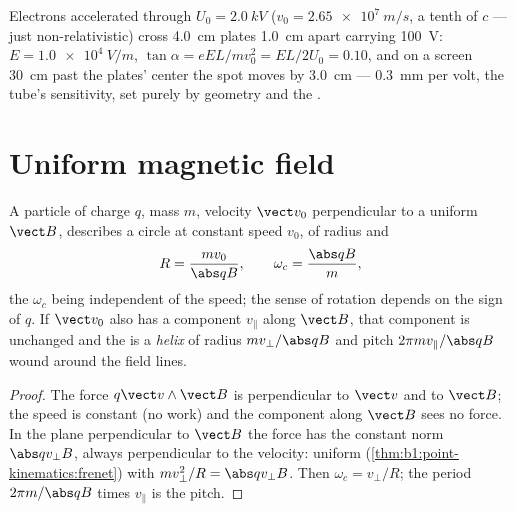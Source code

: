 \begin{example}\label{ex:b1:charged-particles:crt}
Electrons accelerated through $U_0 = \qty{2.0}{kV}$ ($v_0 = \qty{2.65e7}{m/s}$,
a tenth of $c$ --- just non-relativistic) cross \qty{4.0}{cm} plates
\qty{1.0}{cm} apart carrying \qty{100}{V}: $E = \qty{1.0e4}{V/m}$,
$\tan\alpha = eEL/mv_0^2 = EL/2U_0 = 0.10$, and on a screen \qty{30}{cm}
past the plates' center the spot moves by \qty{3.0}{cm} --- \qty{0.3}{mm}
per volt, the tube's sensitivity, set purely by geometry and the
.
\end{example}

\section{Uniform magnetic field}

\begin{theorem}\label{thm:b1:charged-particles:bfield}
A particle of charge $q$, mass $m$, velocity $\vect v_0$ perpendicular to
a uniform $\vect B$, describes a circle at constant speed $v_0$, of radius
and 
\[
R = \frac{mv_0}{\abs q B}, \qquad \omega_c = \frac{\abs q B}{m},
\]
the \emph{} $\omega_c$ being independent of the speed;
the sense of rotation depends on the sign of $q$. If $\vect v_0$ also has
a component $v_\parallel$ along $\vect B$, that component is unchanged and
the  is a \emph{helix} of radius $mv_\perp/\abs qB$ and pitch
$2\pi mv_\parallel/\abs qB$ wound around the field lines.
\end{theorem}

\begin{proof}
The force $q\vect v\wedge\vect B$ is perpendicular to $\vect v$ and to $\vect B$;
the speed is constant (no work) and the component along $\vect B$ sees no
force. In the plane perpendicular to $\vect B$ the force has the constant
norm $\abs qv_\perp B$, always perpendicular to the velocity: uniform
 (\cref{thm:b1:point-kinematics:frenet}) with $mv_\perp^2/R =
\abs qv_\perp B$. Then $\omega_c = v_\perp/R$; the period $2\pi m/\abs qB$ times
$v_\parallel$ is the pitch.
\end{proof}

